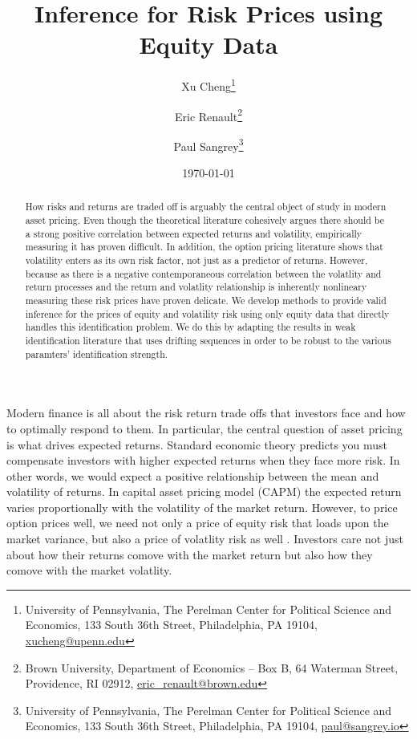 \documentclass[11pt, letterpaper, twoside, final]{article}
\author{Xu Cheng\thanks{University of Pennsylvania, The Perelman Center for Political Science and
    Economics, 133 South 36th Street, Philadelphia, PA 19104, \href{mailto:xucheng@upenn.edu}{xucheng@upenn.edu}}
    \and 
    Eric Renault\thanks{Brown University, Department of Economics -- Box B, 64 Waterman Street, Providence, RI
    02912, \href{mailto:eric_renault@brown.edu}{eric\_renault@brown.edu}}
    \and 
    Paul Sangrey\thanks{University of Pennsylvania, The Perelman Center for Political Science and
    Economics, 133 South 36th Street, Philadelphia, PA 19104, \href{mailto:paul@sangrey.io}{paul@sangrey.io}}}
\title{Inference for Risk Prices using Equity Data}
\date{\today}
\begin{document}
\begin{titlepage}


    \maketitle
    \thispagestyle{empty}
    \addtocounter{page}{-1}

    \begin{abstract} \singlespacing \noindent 
        How risks and returns are traded off is arguably the central object of study in modern asset pricing. 
        Even though the theoretical literature cohesively argues there should be a strong positive correlation
        between expected returns and volatility, empirically measuring it has proven difficult. 
        In addition, the option pricing literature shows that volatility enters as its own risk factor, not just
        as a predictor of returns.
        However, because as there is a negative contemporaneous correlation between the volatlity and return
        processes and the return and volatlity relationship is inherently nonlineary measuring these risk prices
        have proven delicate. 
        We develop methods to provide  valid inference for the prices of equity and volatility risk using only
        equity data that directly handles this identification problem. 
        We do this by adapting the results in weak identification literature that uses drifting sequences in order
        to be robust to the various paramters' identification strength. 
    \end{abstract}



\end{titlepage}

{}

Modern finance is all about the risk return trade offs that investors face and how to optimally respond to them. 
In particular, the central question of asset pricing is what drives expected returns.
Standard economic theory predicts you must compensate investors with higher expected returns when they face more
risk.
In other words, we would expect a positive relationship between the mean and volatility of returns.
In  capital asset pricing model (CAPM) the expected
return varies proportionally with the volatility of the market return.
However, to price option prices well, we need not only a price of equity risk that loads upon the market variance,
but also a price of volatlity risk as well \parencite{christoffersen2013capturing}.
Investors care not just about how their returns comove with the market return but also how they comove with the
market volatlity.
\end{document}
